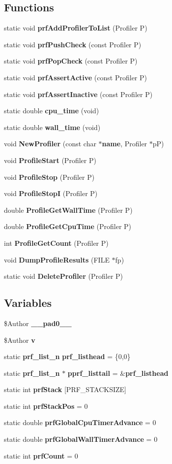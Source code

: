 \subsection*{Functions}
\begin{CompactItemize}
\item 
static void {\bf prf\-Add\-Profiler\-To\-List} (Profiler P)
\item 
static void {\bf prf\-Push\-Check} (const Profiler P)
\item 
static void {\bf prf\-Pop\-Check} (const Profiler P)
\item 
static void {\bf prf\-Assert\-Active} (const Profiler P)
\item 
static void {\bf prf\-Assert\-Inactive} (const Profiler P)
\item 
static double {\bf cpu\_\-time} (void)
\item 
static double {\bf wall\_\-time} (void)
\item 
void {\bf New\-Profiler} (const char $\ast${\bf name}, Profiler $\ast$p\-P)
\item 
void {\bf Profile\-Start} (Profiler P)
\item 
void {\bf Profile\-Stop} (Profiler P)
\item 
void {\bf Profile\-Stop\-I} (Profiler P)
\item 
double {\bf Profile\-Get\-Wall\-Time} (Profiler P)
\item 
double {\bf Profile\-Get\-Cpu\-Time} (Profiler P)
\item 
int {\bf Profile\-Get\-Count} (Profiler P)
\item 
void {\bf Dump\-Profile\-Results} (FILE $\ast$fp)
\item 
static void {\bf Delete\-Profiler} (Profiler P)
\end{CompactItemize}
\subsection*{Variables}
\begin{CompactItemize}
\item 
\$Author {\bf \_\-\_\-pad0\_\-\_\-}
\item 
\$Author {\bf v}
\item 
static {\bf prf\_\-list\_\-n} {\bf prf\_\-listhead} = \{0,0\}
\item 
static {\bf prf\_\-list\_\-n} $\ast$ {\bf pprf\_\-listtail} = \&{\bf prf\_\-listhead}
\item 
static int {\bf prf\-Stack} [PRF\_\-STACKSIZE]
\item 
static int {\bf prf\-Stack\-Pos} = 0
\item 
static double {\bf prf\-Global\-Cpu\-Timer\-Advance} = 0
\item 
static double {\bf prf\-Global\-Wall\-Timer\-Advance} = 0
\item 
static int {\bf prf\-Count} = 0
\end{CompactItemize}


